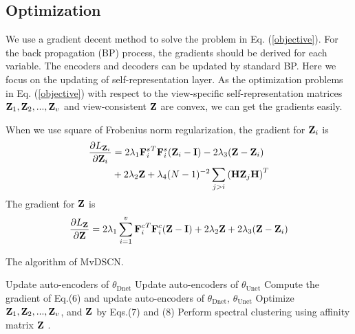 \documentclass[journal]{IEEEtran}
\begin{document}
\subsection{Optimization}
We use a gradient decent method to solve the problem in Eq. (\ref{objective}).
For the back propagation (BP) process, the gradients should be derived for each variable.
The encoders and decoders can be updated by standard BP.
Here we focus on the updating of self-representation layer.
As the optimization problems in Eq. (\ref{objective}) with respect to the view-specific self-representation matrices ${\bf{Z}}_1, {\bf{Z}}_2,...,{\bf{Z}}_v$ and view-consistent $\bf{Z}$ are convex, we can get the gradients easily.

When we use square of Frobenius norm regularization, the gradient for ${\bf{Z}}_i$ is
\begin{equation}
\begin{aligned}
\frac{\partial{L_{{\bf{Z}}_i}}}{\partial{{\bf{Z}}_i}}
& = 2 \lambda_1 {{{\bf{F}}_i^s}^T {{\bf{F}}_i^s} ({\bf{Z}}_i - \bf{I})}  -
2 \lambda_3 ({{\bf{Z}} - {{\bf{Z}}_i}})  \\
& + 2 \lambda_2 {\bf{Z}} + \lambda_4 (N-1)^{-2} \sum\limits_{j > i}{({\bf{H}}{{\bf{Z}}_j}{\bf{H}})}^T \\
\end{aligned}
\end{equation}
The gradient for ${\bf{Z}}$ is
\begin{equation}
\begin{aligned}
\frac{\partial{L_{\bf{Z}}}}{\partial{\bf{Z}}}
= 2 \lambda_1 \sum\limits_{i = 1}^v {{{\bf{F}}_i^c}^T {{\bf{F}}_i^c} ({\bf{Z}} - \bf{I})} + {2 \lambda_2 \bf{Z}} + 2 \lambda_3 ({\bf{Z}} - {\bf{Z}}_i)
\end{aligned}
\end{equation}


\begin{algorithm}
	\caption{The algorithm of MvDSCN.}
	{
		Update auto-encoders of $\theta_{\text{Dnet}}$\;
		Update auto-encoders of $\theta_{\text{Unet}}$\;
	}
	{
		Compute the gradient of Eq.(6) and update auto-encoders of $\theta_{\text{Dnet}}$, $\theta_{\text{Unet}}$ \;
		Optimize ${{\bf{Z}}_1},{{\bf{Z}}_2},...,{{\bf{Z}}_v}$, and ${\bf{Z}}$ by Eqs.(7) and (8)\;
	}
	Perform spectral clustering using affinity matrix ${\bf{Z}}$\;	
	.
	\label{alg}
\end{algorithm}
\end{document}
